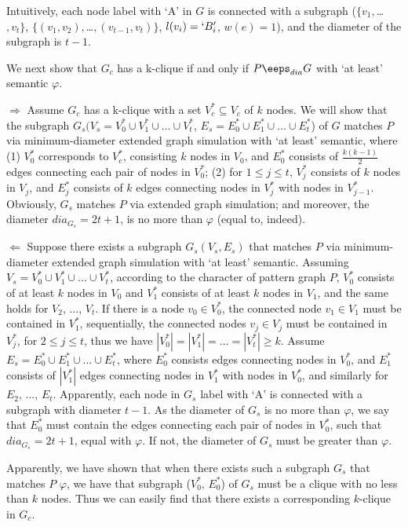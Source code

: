 Intuitively, each node label with `A' in $G$ is connected with a subgraph ($\{v_1, $\ldots$, v_t\}$, $\{(v_1, v_2), $\ldots$, (v_{t-1}, v_t)\}$, $l(v_i)=`B_i'$, $w(e)=1$), and the diameter of the subgraph is $t-1$.

We next show that $G_c$ has a k-clique if and only if $P \eeps_{dia} G$ with `at least' semantic \wrt $\varphi$.

\stab
{$\Rightarrow$}
Assume $G_c$ has a k-clique with a set $V_c^* \subseteq V_c$ of $k$ nodes. We will show that the subgraph $G_s(V_s=V_0^* \cup V_1^* \cup \ldots \cup V_t^*$, $E_s=E_0^* \cup E_1^* \cup \ldots \cup E_t^*$) of $G$ matches $P$ via minimum-diameter extended graph simulation with `at least' semantic, where (1) $V_0^*$ corresponds to $V_c^*$, consisting $k$ nodes in $V_0$, and $E_0^*$ consists of $\frac{k(k-1)}{2}$ edges connecting each pair of nodes in $V_0^*$; (2) for $1 \leq j \leq t$, $V_j^*$ consists of $k$ nodes in $V_j$, and $E_j^*$ consists of $k$ edges connecting nodes in $V_j^*$ with nodes in $V_{j-1}^*$. Obviously, $G_s$ matches $P$ via extended graph simulation; and moreover, the diameter $dia_{G_s}=2t+1$, is no more than $\varphi$ (equal to, indeed).

\stab
{$\Leftarrow$}
Suppose there exists a subgraph $G_s(V_s,E_s)$ that matches $P$ via minimum-diameter extended graph simulation with `at least' semantic. Assuming $V_s=V_0^* \cup V_1^* \cup \ldots \cup V_t^*$, according to the character of pattern graph $P$, $V_0^*$ consists of at least $k$ nodes in $V_0$ and $V_1^*$ consists of at least $k$ nodes in $V_1$, and the same holds for $V_2$, $\ldots$, $V_t$. If there is a node $v_0 \in V_0^*$, the connected node $v_1 \in V_1$ must be contained in $V_1^*$, sequentially, the connected nodes $v_j \in V_j$ must be contained in $V_j^*$, for $2 \leq j \leq t$, thus we have $|V_0^*|=|V_1^*|=\ldots=|V_t^*| \geq k$. Assume $E_s=E_0^* \cup E_1^* \cup \ldots \cup E_t^*$, where $E_0^*$ consists edges connecting nodes in $V_0^*$, and $E_1^*$ consists of $|V_1^*|$ edges connecting nodes in $V_1^*$ with nodes in $V_0^*$, and similarly for $E_2$, $\ldots$, $E_t$. Apparently, each node in $G_s$ label with `A' is connected with a subgraph with diameter $t-1$. As the diameter of $G_s$ is no more than $\varphi$, we say that $E_0^*$ must contain the edges connecting each pair of nodes in $V_0^*$, such that $dia_{G_s}=2t+1$, equal with $\varphi$. If not, the diameter of $G_s$ must be greater than $\varphi$.

Apparently, we have shown that when there exists such a subgraph $G_s$ that matches $P$ \wrt $\varphi$, we have that subgraph ($V_0^*$, $E_0^*$) of $G_s$ must be a clique with no less than $k$ nodes. Thus we can easily find that there exists a corresponding $k$-clique in $G_c$.

